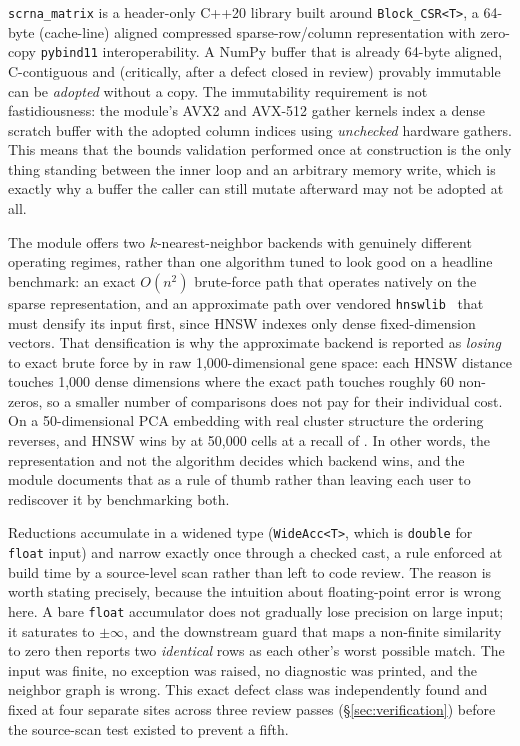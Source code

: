 \documentclass[10pt,twocolumn]{article}
\begin{document}
\texttt{scrna\_matrix} is a header-only C++20 library built around
\texttt{Block\_CSR<T>}, a 64-byte (cache-line) aligned compressed
sparse-row/column representation with zero-copy \texttt{pybind11}
interoperability. A NumPy buffer that is already 64-byte aligned,
C-contiguous and (critically, after a defect closed in review) provably
immutable can be \emph{adopted} without a copy. The immutability requirement
is not fastidiousness: the module's AVX2 and AVX-512 gather kernels index a
dense scratch buffer with the adopted column indices using \emph{unchecked}
hardware gathers. This means that the bounds validation performed once at
construction is the only thing standing between the inner loop and an
arbitrary memory write, which is exactly why a buffer the caller can still
mutate afterward may not be adopted at all.

The module offers two $k$-nearest-neighbor backends with genuinely different
operating regimes, rather than one algorithm tuned to look good on a headline
benchmark: an exact $O(n^2)$ brute-force path that operates natively on the
sparse representation, and an approximate path over vendored
\texttt{hnswlib}~\citep{malkov2018hnsw} that must densify its input first,
since HNSW indexes only dense fixed-dimension vectors. That densification is
why the approximate backend is reported as \emph{losing} to exact brute force
by \ScrnaHnswGeneSpaceSlowdown{} in raw \mbox{1,000-dimensional} gene space:
each HNSW distance touches 1,000 dense dimensions where the exact path
touches roughly 60 non-zeros, so a smaller number of comparisons does not pay
for their individual cost. On a 50-dimensional PCA embedding with real
cluster structure the ordering reverses, and HNSW wins by
\ScrnaHnswFiftyKSpeedup{} at 50,000 cells at a recall of
\ScrnaHnswFiftyKRecall{}. In other words, the representation and not the
algorithm decides which backend wins, and the module documents that as a rule
of thumb rather than leaving each user to rediscover it by benchmarking both.

Reductions accumulate in a widened type (\texttt{WideAcc<T>}, which is
\texttt{double} for \texttt{float} input) and narrow exactly once through a
checked cast, a rule enforced at build time by a source-level scan rather
than left to code review. The reason is worth stating precisely, because the
intuition about floating-point error is wrong here. A bare \texttt{float}
accumulator does not gradually lose precision on large input; it saturates to
$\pm\infty$, and the downstream guard that maps a non-finite similarity to
zero then reports two \emph{identical} rows as each other's worst possible
match. The input was finite, no exception was raised, no diagnostic was
printed, and the neighbor graph is wrong. This exact defect class was
independently found and fixed at four separate sites across three review
passes (\S\ref{sec:verification}) before the source-scan test existed to
prevent a fifth.
\end{document}
